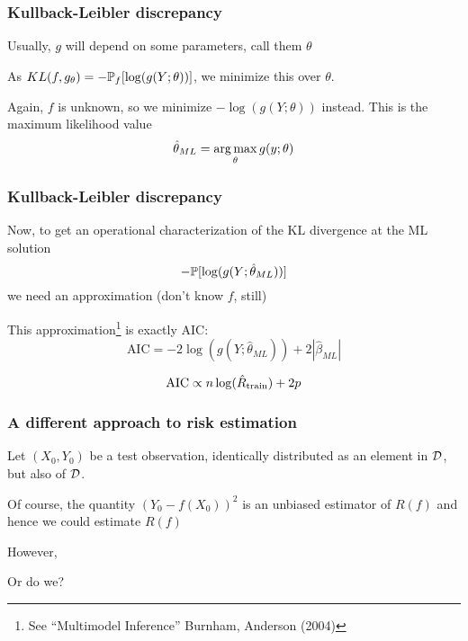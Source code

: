 \documentclass{beamer}
\begin{document}
\begin{frame}
\frametitle{ Kullback-Leibler discrepancy  }
Usually, $g$ will depend on some parameters, call them $\theta$
\vsp


\vsp
As $KL(f,g_\theta) = -\P_f [\log (g(Y;\theta))]$, we minimize this over $\theta$.

\vsp
Again, $f$ is unknown, so we minimize $-\log (g(Y;\theta))$ instead.  This is the maximum likelihood value
\[
\hat{\theta}_{ML} = \argmax_\theta g(y;\theta)
\]

\end{frame}

\begin{frame}
\frametitle{ Kullback-Leibler discrepancy  }
Now, to get an operational characterization of the KL divergence at the ML solution
\[
-\P [\log (g(Y;\hat\theta_{ML}))]
\]
we need an approximation (don't know $f$, still)

\vsp
This approximation\footnote{See ``Multimodel Inference'' Burnham, Anderson (2004)} is exactly AIC\Note:
\[
\textrm{AIC} = -2\log (g(Y;\hat\theta_{ML})) + 2|\hat\beta_{ML}|
\]

\[
\textrm{AIC} \propto n \log(\train) + 2p 
\]


\end{frame}


\begin{frame}
\frametitle{A different approach to risk estimation}
 Let $(X_0,Y_0)$ be a test
observation, identically distributed as an element in $\data$, but also  of $\data$.
\vvsp

\vsp

Of course, the quantity $(Y_0 - f(X_0))^2$ is an unbiased estimator of $R(f)$ and hence we could
estimate $R(f)$
\vsp

However, 

\vsp
Or do we?

\end{frame}
\end{document}
